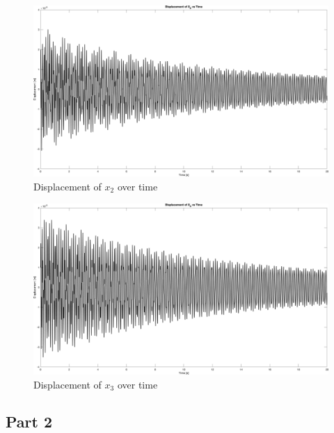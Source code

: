 \documentclass{article}
\begin{document}
\begin{figure}[H]
    \vspace{-10pt}
    \includegraphics[width=1\textwidth,left]{MCHE 6390/Project 1/Figures/Figure_2.png}
    \captionsetup{justification=raggedright,singlelinecheck=false}
    \caption{Displacement of $x_2$ over time}
    \label{fig:x_2}
\end{figure}

\begin{figure}[H]
    \vspace{-10pt}
    \includegraphics[width=1\textwidth,left]{MCHE 6390/Project 1/Figures/Figure_3.png}
    \captionsetup{justification=raggedright,singlelinecheck=false}
    \caption{Displacement of $x_3$ over time}
    \label{fig:x_3}
\end{figure}

\subsection*{Part 2}
\end{document}
